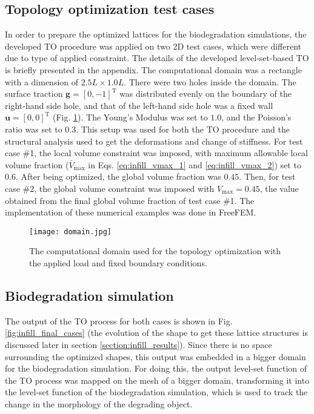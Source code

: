 \subsection{Topology optimization test cases}\label{Section: numerical examples}
In order to prepare the optimized lattices for the biodegradation simulations, the developed \gls{TO} procedure was applied on two 2D test cases, which were different due to type of applied constraint. The details of the developed level-set-based TO is briefly presented in the appendix. The computational domain was a rectangle with a dimension of $2.5L \times 1.0L$. There were two holes inside the domain. The surface traction $\boldsymbol{g}=\left[0,-1\right]^{\operatorname{T}}$ was distributed evenly on the boundary of the right-hand side hole, and that of the left-hand side hole was a fixed wall $\boldsymbol{u}=\left[0,0\right]^{\operatorname{T}}$ (Fig. \ref{fig:infill_domain}). The Young's Modulus was set to $1.0$, and the Poisson's ratio was set to $0.3$. This setup was used for both the TO procedure and the structural analysis used to get the deformations and change of stiffness. For test case \#1, the local volume constraint was imposed, with maximum allowable local volume fraction ($\bar{V}_{\max}$ in Eqs. \ref{eq:infill_vmax_1} and \ref{eq:infill_vmax_2}) set to $0.6$. After being optimized, the global volume fraction was $0.45$. Then, for test case \#2, the global volume constraint was imposed with $V_{\max}=0.45$, the value obtained from the final global volume fraction of test case \#1. The implementation of these numerical examples was done in FreeFEM.

\begin{figure}[h]
\centering
\medskip
\texttt{[image: domain.jpg]}
\caption[Computational domain for the topology optimization]{The computational domain used for the topology optimization with the applied load and fixed boundary conditions.} \label{fig:infill_domain}
\end{figure}

\subsection{Biodegradation simulation}\label{section:biodegradation}

The output of the \gls{TO} process for both cases is shown in Fig. \ref{fig:infill_final_cases} (the evolution of the shape to get these lattice structures is discussed later in section \ref{section:infill_results}). Since there is no space surrounding the optimized shapes, this output was embedded in a bigger domain for the biodegradation simulation. For doing this, the output level-set function of the \gls{TO} process was mapped on the mesh of a bigger domain, transforming it into the level-set function of the biodegradation simulation, which is used to track the change in the morphology of the degrading object. 

